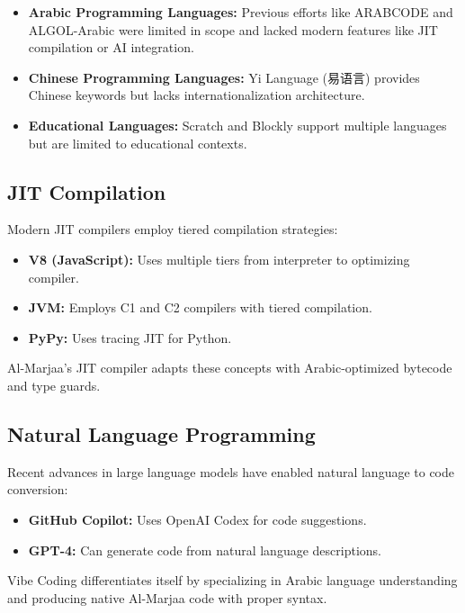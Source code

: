 \documentclass[11pt,a4paper]{article}
\begin{document}
\begin{itemize}
    \item \textbf{Arabic Programming Languages:} Previous efforts like ARABCODE and ALGOL-Arabic were limited in scope and lacked modern features like JIT compilation or AI integration.
    
    \item \textbf{Chinese Programming Languages:} Yi Language (易语言) provides Chinese keywords but lacks internationalization architecture.
    
    \item \textbf{Educational Languages:} Scratch and Blockly support multiple languages but are limited to educational contexts.
\end{itemize}

\subsection{JIT Compilation}

Modern JIT compilers employ tiered compilation strategies:

\begin{itemize}
    \item \textbf{V8 (JavaScript):} Uses multiple tiers from interpreter to optimizing compiler.
    \item \textbf{JVM:} Employs C1 and C2 compilers with tiered compilation.
    \item \textbf{PyPy:} Uses tracing JIT for Python.
\end{itemize}

Al-Marjaa's JIT compiler adapts these concepts with Arabic-optimized bytecode and type guards.

\subsection{Natural Language Programming}

Recent advances in large language models have enabled natural language to code conversion:

\begin{itemize}
    \item \textbf{GitHub Copilot:} Uses OpenAI Codex for code suggestions.
    \item \textbf{GPT-4:} Can generate code from natural language descriptions.
\end{itemize}

Vibe Coding differentiates itself by specializing in Arabic language understanding and producing native Al-Marjaa code with proper syntax.
\end{document}
